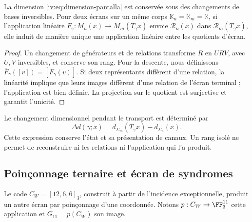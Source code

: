 \begin{proposition}
\label{iv:prop:pantalla-transporte}
La dimension \eqref{iv:eq:dimension-pantalla} est conservée
sous des changements de bases inversibles. Pour deux écrans sur un même corps
\(\mathbb K_n=\mathbb K_m=\mathbb K\), si l’application linéaire
\(F_\gamma:M_n(x)\to M_m(T_\gamma x)\) envoie
\(\mathcal R_n(x)\) dans \(\mathcal R_m(T_\gamma x)\), elle induit
de manière unique une application linéaire entre les quotients d’écran.
\end{proposition}
\begin{proof}
Un changement de générateurs et de relations transforme \(R\) en
\(URV\), avec \(U,V\) inversibles, et conserve son rang. Pour
la descente, nous définissons
\(\overline F_\gamma([v])=[F_\gamma(v)]\). Si deux
représentants diffèrent d’une relation, la linéarité implique que leurs images diffèrent
d’une relation de l’écran terminal ; l’application est
bien définie. La projection sur le quotient est surjective et
garantit l’unicité.

\end{proof}

Le changement dimensionnel pendant le transport est déterminé
par
\[
 \Delta d(\gamma;x)=d_{\Sigma_m}(T_\gamma x)
                         -d_{\Sigma_n}(x).
\]
Cette expression conserve l’état et sa présentation de canaux.
Un rang isolé ne permet de reconstruire ni les relations ni
l’application qui l’a produit.

\subsection{Poinçonnage ternaire et écran de syndromes}

Le code \(C_W=[12,6,6]_3\), construit à partir de
l’incidence exceptionnelle, produit un autre écran par
poinçonnage d’une coordonnée. Notons
\(p:C_W\to\FF_3^{11}\) cette application et
\(G_{11}=p(C_W)\) son image.


